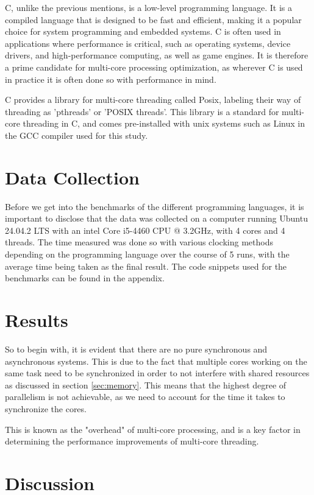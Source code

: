 \documentclass{article}
\begin{document}
C, unlike the previous mentions, is a low-level programming language. It is a compiled language that is designed to be fast and efficient, making it a popular choice for system programming and embedded systems. C is often used in applications where performance is critical, such as operating systems, device drivers, and high-performance computing, as well as game engines. It is therefore a prime candidate for multi-core processing optimization, as wherever C is used in practice it is often done so with performance in mind.

C provides a library for multi-core threading called Posix, labeling their way of threading as 'pthreads' or 'POSIX threads'. This library is a standard for multi-core threading in C, and comes pre-installed with unix systems such as Linux in the GCC compiler used for this study.

\section{Data Collection}

Before we get into the benchmarks of the different programming languages, it is important to disclose that the data was collected on a computer running Ubuntu 24.04.2 LTS with an intel Core i5-4460 CPU @ 3.2GHz, with 4 cores and 4 threads. The time measured was done so with various clocking methods depending on the programming language over the course of 5 runs, with the average time being taken as the final result. The code snippets used for the benchmarks can be found in the appendix.



\section{Results}

So to begin with, it is evident that there are no pure synchronous and asynchronous systems. This is due to the fact that multiple cores working on the same task need to be synchronized in order to not interfere with shared resources as discussed in section \ref{sec:memory}. This means that the highest degree of parallelism is not achievable, as we need to account for the time it takes to synchronize the cores. 

This is known as the "overhead" of multi-core processing, and is a key factor in determining the performance improvements of multi-core threading.

\section{Discussion}
\end{document}

